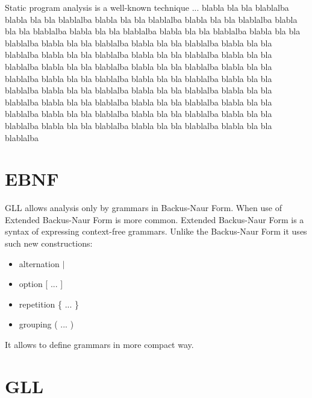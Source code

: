 \documentclass[runningheads,a4paper]{llncs}
\begin{document}
Static program analysis is a well-known technique ...
blabla bla bla blablalba blabla bla bla blablalba blabla bla bla blablalba blabla bla bla blablalba 
blabla bla bla blablalba blabla bla bla blablalba blabla bla bla blablalba blabla bla bla blablalba 
blabla bla bla blablalba blabla bla bla blablalba blabla bla bla blablalba blabla bla bla blablalba 
blabla bla bla blablalba blabla bla bla blablalba blabla bla bla blablalba blabla bla bla blablalba 
blabla bla bla blablalba blabla bla bla blablalba blabla bla bla blablalba blabla bla bla blablalba 
blabla bla bla blablalba blabla bla bla blablalba blabla bla bla blablalba blabla bla bla blablalba 
blabla bla bla blablalba blabla bla bla blablalba blabla bla bla blablalba blabla bla bla blablalba 
blabla bla bla blablalba blabla bla bla blablalba blabla bla bla blablalba blabla bla bla blablalba 


\section{EBNF}%

GLL allows analysis only by grammars in Backus-Naur Form. When use of Extended Backus-Naur Form is more common.
Extended Backus-Naur Form is a syntax of expressing context-free grammars. Unlike the Backus-Naur Form it 
uses such new constructions:
\begin{itemize}
    \item alternation $\mid$
    \item option [ ... ]
    \item repetition \{ ... \}
    \item grouping ( ... )
\end{itemize}
 
It allows to define grammars in more compact way.




\section{GLL}%
\end{document}
